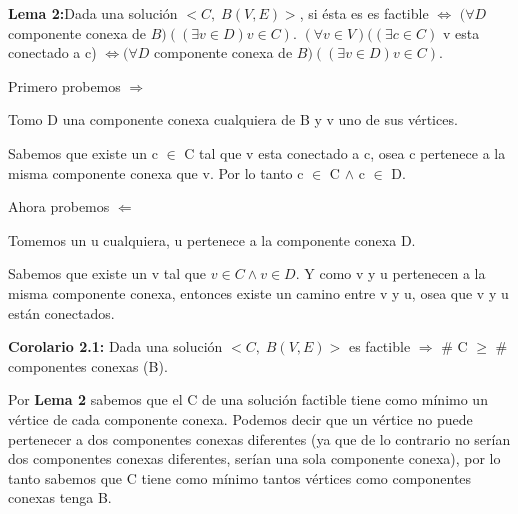 \textbf{Lema 2:}Dada una solución $<C,\;B(V,E)>$, si ésta es es factible $\Longleftrightarrow$ $(\forall D$ componente conexa de $B)((\exists v \in D) v \in C)$.  $(\forall v \in V)((\exists c \in C)$ v esta conectado a c) $\Leftrightarrow (\forall D$ componente conexa de $B)((\exists v \in D) v \in C)$.


Primero probemos $\Rightarrow$

Tomo D una componente conexa cualquiera de B y v uno de sus vértices.

Sabemos que existe un c $\in$ C tal que v esta conectado a c, osea c pertenece a la misma componente conexa que v. Por lo tanto c $\in$ C $\wedge$ c $\in$ D.

Ahora probemos $\Leftarrow$

Tomemos un u cualquiera, u pertenece a la componente conexa D.

Sabemos que existe un v tal que $v \in C \wedge v \in D$. Y como v y u pertenecen a la misma componente conexa, entonces existe un camino entre v y u, osea que v y u están conectados.

\textbf{Corolario 2.1:} Dada una solución $<C,\;B(V,E)>$ es factible $\Rightarrow$ \# C $\geq$ \# componentes conexas (B).

Por \textbf{Lema 2} sabemos que el C de una solución factible tiene como mínimo un vértice de cada componente conexa. Podemos decir que un vértice no puede pertenecer a dos componentes conexas diferentes (ya que de lo contrario no serían dos componentes conexas diferentes, serían una sola componente conexa), por lo tanto sabemos que C tiene como mínimo tantos vértices como componentes conexas tenga B.

%
%
%
%
%



